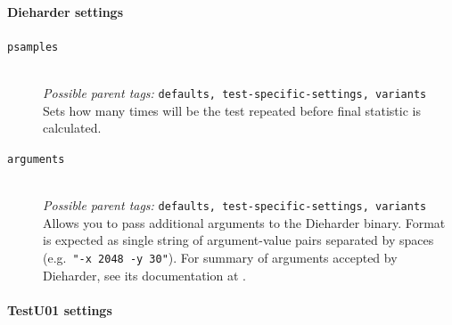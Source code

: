 \documentclass[
	digital,    %
	oneside,    %
	color,
	11pt,
	nocover,
	notable,
	nolof,
	nolot,
]{fithesis3}
\theoremstyle{definition}
\theoremstyle{remark}
\begin{document}
\paragraph{Dieharder settings}

\begin{description}
\item[\texttt{psamples}] \hfill \\
\textit{Possible parent tags: } \texttt{defaults, test-specific-settings, variants} \\
Sets how many times will be the test repeated before final statistic is calculated.

\item[\texttt{arguments}] \hfill \\
\textit{Possible parent tags: } \texttt{defaults, test-specific-settings, variants} \\
Allows you to pass additional arguments to the Dieharder binary. Format is expected as single string of argument-value pairs separated by spaces (e.g.~\texttt{"-x 2048 -y 30"}). For summary of arguments accepted by Dieharder, see its documentation at \cite{dieharder-manpage}.

\end{description}

\paragraph{TestU01 settings}
\end{document}
